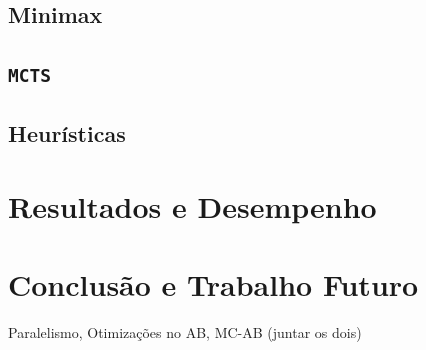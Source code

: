 \documentclass[12pt,a4paper,oneside]{article}
\begin{document}
\lipsum[1]

\subsection{Minimax}

\lipsum[1]

\lipsum[2]

\subsection{\texttt{MCTS}}

\lipsum[1]

\lipsum[2]

\lipsum[3]

\subsection{Heurísticas}

\lipsum[1]

\lipsum[2]

\lipsum[3]


\section{Resultados e Desempenho}
\label{sec:resdes}

\lipsum[1]

\lipsum[2]

\lipsum[3]


\section{Conclusão e Trabalho Futuro}
\label{sec:conc}

Paralelismo, Otimizações no AB, MC-AB (juntar os dois)\cite{Dutra:2015}

\lipsum[1]

\lipsum[2]



\end{document}
